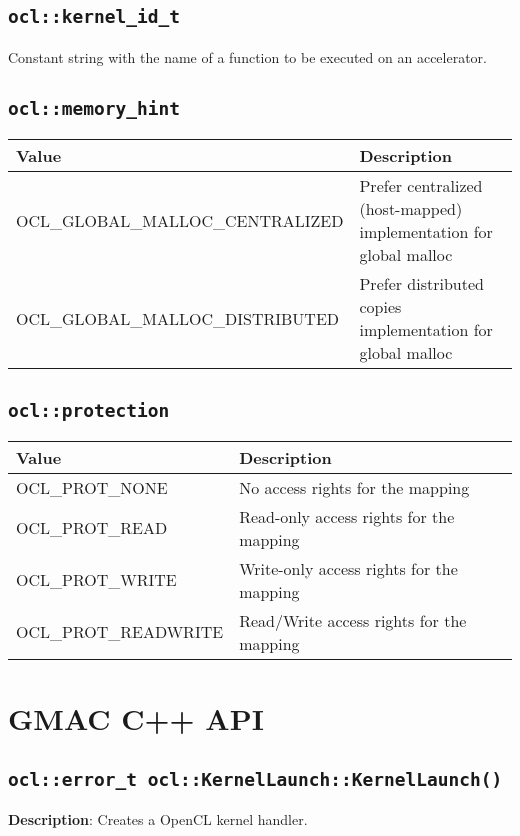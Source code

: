\subsection{\texttt{ocl::kernel\_id\_t}}

Constant string with the name of a function to be executed on an accelerator.

\subsection{\texttt{ocl::memory\_hint}}

\begin{tabular}{|l|l|}
  \hline
  Value & Description \\
  \hline
  \hline
  OCL\_GLOBAL\_MALLOC\_CENTRALIZED & Prefer centralized (host\hyp{}mapped) implementation for global 
  malloc \\
  OCL\_GLOBAL\_MALLOC\_DISTRIBUTED & Prefer distributed copies implementation for global malloc \\
  \hline
\end{tabular}


\subsection{\texttt{ocl::protection}}

\begin{tabular}{|l|l|}
  \hline
  Value & Description \\
  \hline
  \hline
  OCL\_PROT\_NONE  & No access rights for the mapping \\
  OCL\_PROT\_READ  & Read\hyp{}only access rights for the mapping \\
  OCL\_PROT\_WRITE & Write\hyp{}only access rights for the mapping \\
  OCL\_PROT\_READWRITE & Read\slash{}Write access rights for the mapping \\
  \hline
\end{tabular}

\section{GMAC C++ API}

\subsection{\texttt{ocl::error\_t ocl::KernelLaunch::KernelLaunch()}}

\textbf{Description}: Creates a OpenCL kernel handler.

